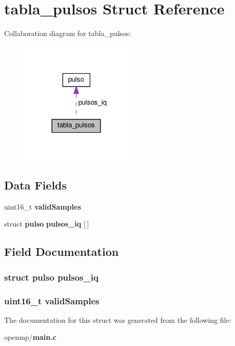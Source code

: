 \section{tabla\+\_\+pulsos Struct Reference}
\label{structtabla__pulsos}


Collaboration diagram for tabla\+\_\+pulsos\+:
\nopagebreak
\begin{figure}[H]
\begin{center}
\leavevmode
\includegraphics[width=161pt]{structtabla__pulsos__coll__graph}
\end{center}
\end{figure}
\subsection*{Data Fields}
\begin{DoxyCompactItemize}
\item 
uint16\+\_\+t {\bf valid\+Samples}
\item 
struct {\bf pulso} {\bf pulsos\+\_\+iq} [$\,$]
\end{DoxyCompactItemize}


\subsection{Field Documentation}
\subsubsection[{pulsos\+\_\+iq}]{\setlength{\rightskip}{0pt plus 5cm}struct {\bf pulso} pulsos\+\_\+iq}\label{structtabla__pulsos_a127fdeb6df16b8c86d77eb90f1a09113}
\subsubsection[{valid\+Samples}]{\setlength{\rightskip}{0pt plus 5cm}uint16\+\_\+t valid\+Samples}\label{structtabla__pulsos_a3ee39c4c3a761ca1fe094dfc0723ec11}


The documentation for this struct was generated from the following file\+:\begin{DoxyCompactItemize}
\item 
openmp/{\bf main.\+c}\end{DoxyCompactItemize}
